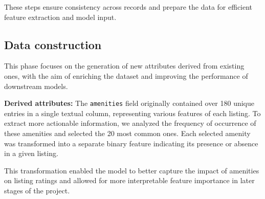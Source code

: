 These steps ensure consistency across records and prepare the data for efficient feature extraction and model input.

\subsection{Data construction}
\label{sec:dataConstruction}
This phase focuses on the generation of new attributes derived from existing ones, with the aim of enriching the dataset and improving the performance of downstream models.

\textbf{Derived attributes:}  
The \texttt{amenities} field originally contained over 180 unique entries in a single textual column, representing various features of each listing. To extract more actionable information, we analyzed the frequency of occurrence of these amenities and selected the 20 most common ones. Each selected amenity was transformed into a separate binary feature indicating its presence or absence in a given listing.

This transformation enabled the model to better capture the impact of amenities on listing ratings and allowed for more interpretable feature importance in later stages of the project.
